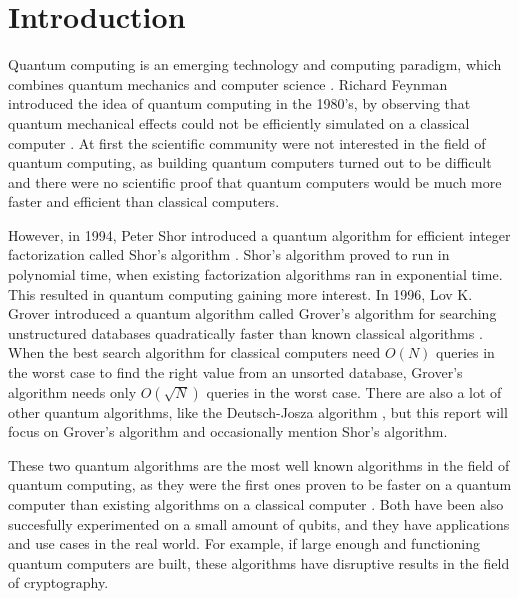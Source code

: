 \documentclass[english,oneside,openright]{UH_DS_report}
\begin{document}
\chapter{Introduction}
\label{chapter:intro}

Quantum computing is an emerging technology and computing paradigm, which combines quantum mechanics and computer science \cite{ambainis2004quantum, qcdb}. Richard Feynman introduced the idea of quantum computing in the 1980's, by observing that quantum mechanical effects could not be efficiently simulated on a classical computer \cite{introtoqc}. At first the scientific community were not interested in the field of quantum computing, as building quantum computers turned out to be difficult and there were no scientific proof that quantum computers would be much more faster and efficient than classical computers. 

However, in 1994, Peter Shor introduced a quantum algorithm for efficient integer factorization called Shor's algorithm \cite{introtoqc}. Shor's algorithm proved to run in polynomial time, when existing factorization algorithms ran in exponential time. This resulted in quantum computing gaining more interest. In 1996, Lov K. Grover introduced a quantum algorithm called Grover's algorithm for searching unstructured databases quadratically faster than known classical algorithms \cite{grover1996fast}. When the best search algorithm for classical computers need $O(N)$ queries in the worst case to find the right value from an unsorted database, Grover's algorithm needs only $O(\sqrt{N})$ queries in the worst case. There are also a lot of other quantum algorithms, like the Deutsch-Josza algorithm \cite{giri2017review}, but this report will focus on Grover's algorithm and occasionally mention Shor's algorithm.

These two quantum algorithms are the most well known algorithms in the field of quantum computing, as they were the first ones proven to be faster on a quantum computer than existing algorithms on a classical computer \cite{ambainis2004quantum}. Both have been also succesfully experimented on a small amount of qubits, and they have applications and use cases in the real world. For example, if large enough and functioning quantum computers are built, these algorithms have disruptive results in the field of cryptography.
\end{document}
